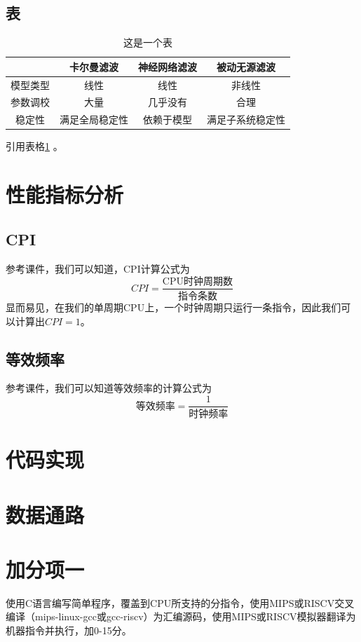\documentclass[12pt]{article} %
\begin{document}
\subsection{表}
\begin{table}[ht]
\caption{这是一个表}
\label{tb:filter}
\centering
\begin{tabular}{cccc}
\hline
 & 卡尔曼滤波 & 神经网络滤波 & 被动无源滤波 \\ 
\hline
模型类型 & 线性 & 线性 & 非线性 \\ 
参数调校 & 大量 & 几乎没有 & 合理 \\ 
稳定性 & 满足全局稳定性 & 依赖于模型 & 满足子系统稳定性 \\ 
\hline
\end{tabular} 
\end{table}
引用表格\ref{tb:filter} 。

\section{性能指标分析}
\subsection{CPI}
参考课件，我们可以知道，CPI计算公式为
$$
CPI = \frac{\mbox{CPU时钟周期数}}{\mbox{指令条数}} 
$$
显而易见，在我们的单周期CPU上，一个时钟周期只运行一条指令，因此我们可以计算出$CPI = 1$。
\subsection{等效频率}
参考课件，我们可以知道等效频率的计算公式为
$$
\mbox{等效频率} = \frac{1}{\mbox{时钟频率}}
$$
\section{代码实现}
\section{数据通路}
\section{加分项一}
使用C语言编写简单程序，覆盖到CPU所支持的分指令，使用MIPS或RISCV交叉编译（mips-linux-gcc或gcc-riscv）为汇编源码，使用MIPS或RISCV模拟器翻译为机器指令并执行，加0-15分。
\end{document}
